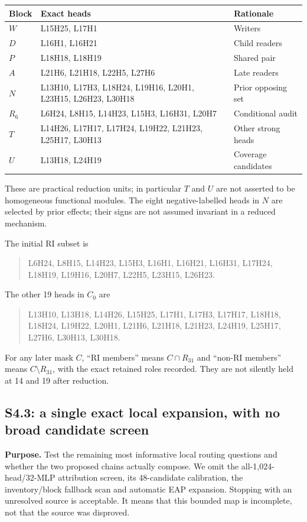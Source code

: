 \begin{longtable}{p{.08\linewidth}>{\raggedright\arraybackslash}p{.64\linewidth}>{\raggedright\arraybackslash}p{.20\linewidth}}
\toprule Block & Exact heads & Rationale\\\midrule\endhead
$W$ & L15H25, L17H1 & Writers\\
$D$ & L16H1, L16H21 & Child readers\\
$P$ & L18H18, L18H19 & Shared pair\\
$A$ & L21H6, L21H18, L22H5, L27H6 & Late readers\\
$N$ & L13H10, L17H3, L18H24, L19H16, L20H1, L23H15, L26H23, L30H18 & Prior opposing set\\
$R_6$ & L6H24, L8H15, L14H23, L15H3, L16H31, L20H7 & Conditional audit\\
$T$ & L14H26, L17H17, L17H24, L19H22, L21H23, L25H17, L30H13 & Other strong heads\\
$U$ & L13H18, L24H19 & Coverage candidates\\\bottomrule
\end{longtable}
These are practical reduction units; in particular $T$ and $U$ are not asserted to be homogeneous functional modules. The eight negative-labelled heads in $N$ are selected by prior effects; their signs are not assumed invariant in a reduced mechanism.

The initial RI subset is
\begin{quote}\small
L6H24, L8H15, L14H23, L15H3, L16H1, L16H21, L16H31, L17H24, L18H19, L19H16, L20H7, L22H5, L23H15, L26H23.
\end{quote}
The other 19 heads in $C_0$ are
\begin{quote}\small
L13H10, L13H18, L14H26, L15H25, L17H1, L17H3, L17H17, L18H18, L18H24, L19H22, L20H1, L21H6, L21H18, L21H23, L24H19, L25H17, L27H6, L30H13, L30H18.
\end{quote}
For any later mask $C$, ``RI members'' means $C\cap R_{31}$ and ``non-RI members'' means $C\setminus R_{31}$, with the exact retained roles recorded. They are not silently held at 14 and 19 after reduction.

\subsection{S4.3: a single exact local expansion, with no broad candidate screen}
\textbf{Purpose.} Test the remaining most informative local routing questions and whether the two proposed chains actually compose. We omit the all-1,024-head/32-MLP attribution screen, its 48-candidate calibration, the inventory/block fallback scan and automatic EAP expansion. Stopping with an unresolved source is acceptable. It means that this bounded map is incomplete, not that the source was disproved.

